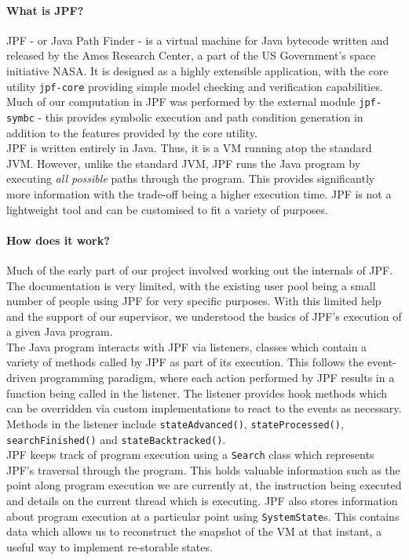 \documentclass[titlepage,11pt]{article}
\begin{document}
\paragraph{What is JPF?}
JPF - or Java Path Finder - is a virtual machine for Java bytecode written and released by the Ames Research Center, a part of the US Government's space initiative NASA. It is designed as a highly extensible application, with the core utility \texttt{jpf-core} providing simple model checking and verification capabilities. Much of our computation in JPF was performed by the external module \texttt{jpf-symbc} - this provides symbolic execution and path condition generation in addition to the features provided by the core utility. \\  

JPF is written entirely in Java. Thus, it is a VM running atop the standard JVM. However, unlike the standard JVM, JPF runs the Java program by executing \textit{all possible} paths through the program. This provides significantly more information with the trade-off being a higher execution time. JPF is not a lightweight tool and can be customised to fit a variety of purposes.   

\paragraph{How does it work?}
Much of the early part of our project involved working out the internals of JPF. The documentation is very limited, with the existing user pool being a small number of people using JPF for very specific purposes. With this limited help and the support of our supervisor, we understood the basics of JPF's execution of a given Java program. \\

The Java program interacts with JPF via listeners, classes which contain a variety of methods called by JPF as part of its execution. This follows the event-driven programming paradigm, where each action performed by JPF results in a function being called in the listener. The listener provides hook methods which can be overridden via custom implementations to react to the events as necessary. Methods in the listener include \texttt{stateAdvanced()}, \texttt{stateProcessed()}, \texttt{searchFinished()} and \texttt{stateBacktracked()}. \\

JPF keeps track of program execution using a \texttt{Search} class which represents JPF's traversal through the program. This holds valuable information such as the point along program execution we are currently at, the instruction being executed and details on the current thread which is executing. JPF also stores information about program execution at a particular point using \texttt{SystemState}s. This contains data which allows us to reconstruct the snapshot of the VM at that instant, a useful way to implement re-storable states. \\
\end{document}
